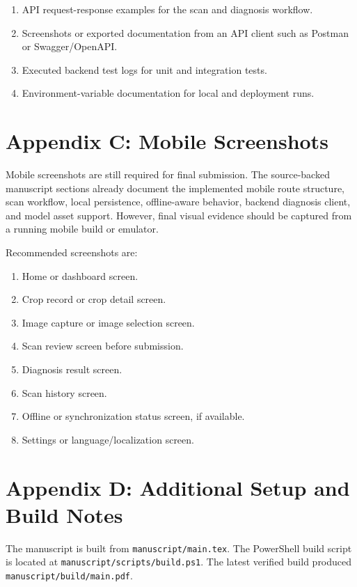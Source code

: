 \begin{enumerate}[label=\arabic*.]
\item API request-response examples for the scan and diagnosis workflow.
\item Screenshots or exported documentation from an API client such as Postman or Swagger/OpenAPI.
\item Executed backend test logs for unit and integration tests.
\item Environment-variable documentation for local and deployment runs.
\end{enumerate}

\section*{Appendix C: Mobile Screenshots}

Mobile screenshots are still required for final submission. The source-backed manuscript sections
already document the implemented mobile route structure, scan workflow, local persistence,
offline-aware behavior, backend diagnosis client, and model asset support. However, final visual
evidence should be captured from a running mobile build or emulator.

Recommended screenshots are:

\begin{enumerate}[label=\arabic*.]
\item Home or dashboard screen.
\item Crop record or crop detail screen.
\item Image capture or image selection screen.
\item Scan review screen before submission.
\item Diagnosis result screen.
\item Scan history screen.
\item Offline or synchronization status screen, if available.
\item Settings or language/localization screen.
\end{enumerate}

\section*{Appendix D: Additional Setup and Build Notes}

The manuscript is built from \texttt{manuscript/main.tex}. The PowerShell build script is located
at \texttt{manuscript/scripts/build.ps1}. The latest verified build produced
\texttt{manuscript/build/main.pdf}.

